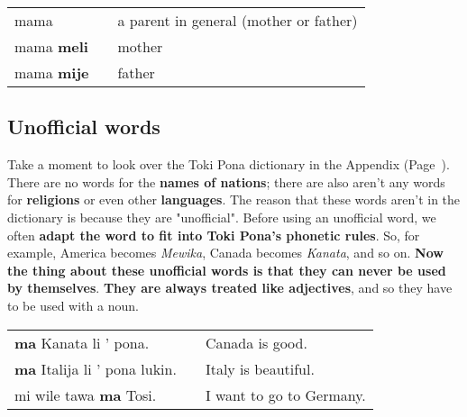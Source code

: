 \begin{supertabular}{p{5,5cm}|ll}
mama && a parent in general (mother or father) \\
mama \textbf{meli} && mother \\
mama \textbf{mije} && father \\
\end{supertabular} 

%
\subsection*{Unofficial words}
%
Take a moment to look over the Toki Pona dictionary in the Appendix (Page~\pageref{'unofficial_words'}). 
There are no words for the \textbf{names of nations}; there are also aren't any words for \textbf{religions} or even other \textbf{languages}. 
The reason that these words aren't in the dictionary is because they are "unofficial". 
Before using an unofficial word, we often \textbf{adapt the word to fit into Toki Pona's phonetic rules}. 
So, for example, America becomes \textit{Mewika}, Canada becomes \textit{Kanata}, and so on. 
\textbf{Now the thing about these unofficial words is that they can never be used by themselves}. 
\textbf{They are always treated like adjectives}, and so they have to be used with a noun. 

\begin{supertabular}{p{5,5cm}|ll}
\textbf{ma} Kanata li ' pona. && Canada is good. \\
\textbf{ma} Italija li ' pona lukin. && Italy is beautiful. \\
mi wile tawa \textbf{ma} Tosi. && I want to go to Germany. \\
\end{supertabular} 


